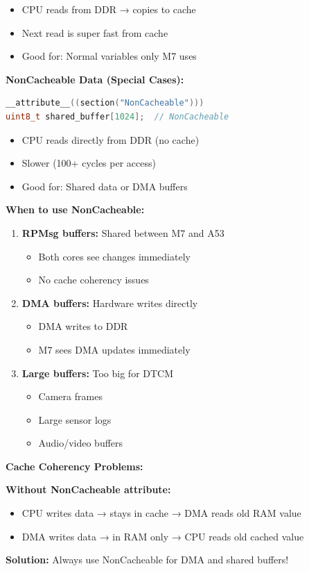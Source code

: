 \documentclass[12pt,a4paper]{report}
\begin{document}
\begin{itemize}
    \item CPU reads from DDR → copies to cache
    \item Next read is super fast from cache
    \item Good for: Normal variables only M7 uses
\end{itemize}

\textbf{NonCacheable Data (Special Cases):}
\begin{lstlisting}[language=c]
__attribute__((section("NonCacheable")))
uint8_t shared_buffer[1024];  // NonCacheable
\end{lstlisting}

\begin{itemize}
    \item CPU reads directly from DDR (no cache)
    \item Slower (100+ cycles per access)
    \item Good for: Shared data or DMA buffers
\end{itemize}

\textbf{When to use NonCacheable:}
\begin{enumerate}
    \item \textbf{RPMsg buffers:} Shared between M7 and A53
    \begin{itemize}
        \item Both cores see changes immediately
        \item No cache coherency issues
    \end{itemize}
    
    \item \textbf{DMA buffers:} Hardware writes directly
    \begin{itemize}
        \item DMA writes to DDR
        \item M7 sees DMA updates immediately
    \end{itemize}
    
    \item \textbf{Large buffers:} Too big for DTCM
    \begin{itemize}
        \item Camera frames
        \item Large sensor logs
        \item Audio/video buffers
    \end{itemize}
\end{enumerate}

\begin{important}
\textbf{Cache Coherency Problems:}

\textbf{Without NonCacheable attribute:}
\begin{itemize}
    \item CPU writes data → stays in cache → DMA reads old RAM value 
    \item DMA writes data → in RAM only → CPU reads old cached value 
\end{itemize}

\textbf{Solution:} Always use NonCacheable for DMA and shared buffers!
\end{important}
\end{document}

